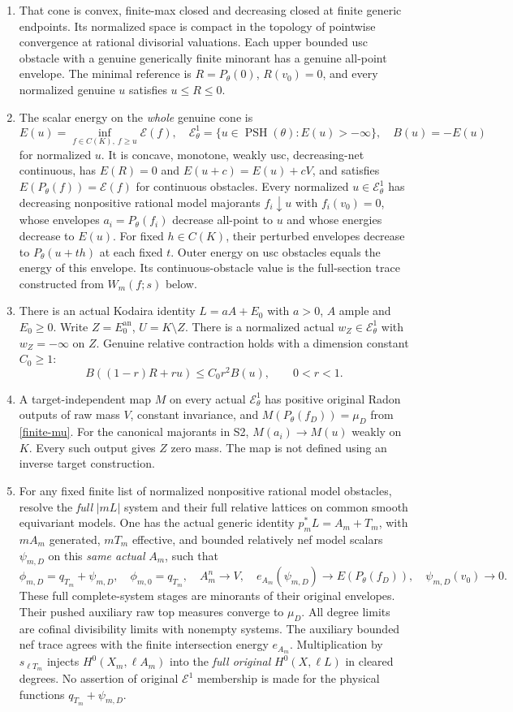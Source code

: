 \documentclass[10pt]{article}
\newcommand{\PSH}{\operatorname{PSH}}
\newcommand{\E}{\mathcal E}
\newcommand{\an}{\mathrm{an}}
\begin{document}
\begin{enumerate}
\item[S1.] That cone is convex, finite-max closed and decreasing closed at
finite generic endpoints. Its normalized space is compact in the topology
of pointwise convergence at rational divisorial valuations. Each upper
bounded usc obstacle with a genuine generically finite minorant has a
genuine all-point envelope. The minimal reference is $R=P_\theta(0)$,
$R(v_0)=0$, and every normalized genuine $u$ satisfies $u\leq R\leq0$.
\item[S2.] The scalar energy on the \emph{whole} genuine cone is
\[
 E(u)=\inf_{f\in C(K),\ f\geq u}\mathscr E(f),\quad
 \E^1_\theta=\{u\in\PSH(\theta):E(u)>-\infty\},\quad B(u)=-E(u)
\]
for normalized $u$. It is concave, monotone, weakly usc, decreasing-net
continuous, has $E(R)=0$ and $E(u+c)=E(u)+cV$, and satisfies
$E(P_\theta(f))=\mathscr E(f)$ for continuous obstacles. Every normalized
$u\in\E^1_\theta$ has decreasing nonpositive rational model majorants
$f_i\downarrow u$ with $f_i(v_0)=0$, whose envelopes $a_i=P_\theta(f_i)$
decrease all-point to $u$ and whose energies decrease to $E(u)$.
For fixed $h\in C(K)$, their perturbed envelopes decrease to
$P_\theta(u+th)$ at each fixed $t$. Outer energy on usc obstacles equals
the energy of this envelope. Its continuous-obstacle value is the
full-section trace constructed from $W_m(f;s)$ below.
\item[S3.] There is an actual Kodaira identity $L=aA+E_0$ with $a>0$,
$A$ ample and $E_0\geq0$. Write $Z=E_0^\an$, $U=K\setminus Z$.
There is a normalized actual $w_Z\in\E^1_\theta$ with $w_Z=-\infty$
on $Z$. Genuine relative contraction holds with a dimension constant
$C_0\geq1$:
\[
 B((1-r)R+ru)\leq C_0r^2B(u),\qquad 0<r<1.
\]
\item[M1.] A target-independent map $M$ on every actual $\E^1_\theta$
has positive original Radon outputs of raw mass $V$, constant invariance,
and $M(P_\theta(f_D))=\mu_D$ from \eqref{finite-mu}.
For the canonical majorants in S2, $M(a_i)\to M(u)$ weakly on $K$.
Every such output gives $Z$ zero mass. The map is not defined using an
inverse target construction.
\item[M2.] For any fixed finite list of normalized nonpositive rational
model obstacles, resolve the \emph{full} $|mL|$ system and their full
relative lattices on common smooth equivariant models. One has the
actual generic identity $p_m^*L=A_m+T_m$, with $mA_m$ generated,
$mT_m$ effective, and bounded relatively nef model scalars $\psi_{m,D}$
on this \emph{same actual} $A_m$, such that
\[
 \phi_{m,D}=q_{T_m}+\psi_{m,D},\quad\phi_{m,0}=q_{T_m},\quad
 A_m^n\to V,\quad e_{A_m}(\psi_{m,D})\to E(P_\theta(f_D)),\quad
 \psi_{m,D}(v_0)\to0.
\]
These full complete-system stages are minorants of their original
envelopes. Their pushed auxiliary raw top measures converge to $\mu_D$.
All degree limits are cofinal divisibility limits with nonempty systems.
The auxiliary bounded nef trace agrees with the finite intersection
energy $e_{A_m}$. Multiplication by $s_{\ell T_m}$ injects
$H^0(X_m,\ell A_m)$ into the \emph{full original} $H^0(X,\ell L)$
in cleared degrees. No assertion of original $\E^1$ membership is made
for the physical functions $q_{T_m}+\psi_{m,D}$.
\end{enumerate}
\end{document}

